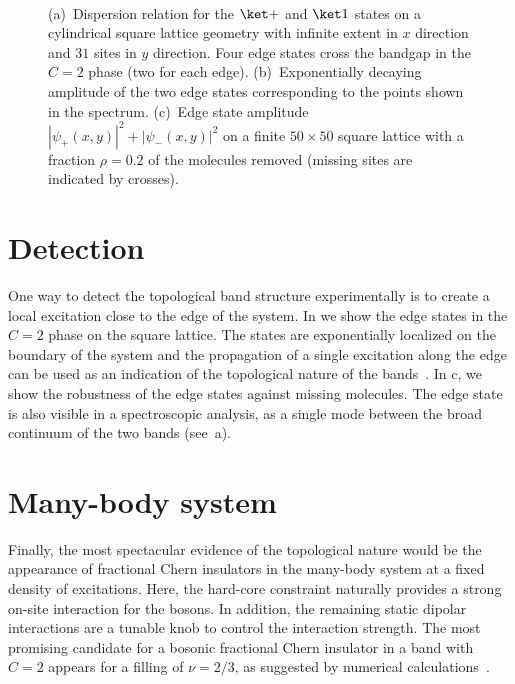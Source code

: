 \begin{figure}[ht]
    \centering
    \begin{minipage}[b]{.482\columnwidth}
         \\
        \vspace{2mm}
    \end{minipage}

    \caption{
        (a)~Dispersion relation for the $\ketp$ and $\keto$ states on a cylindrical square lattice geometry with infinite extent in $x$ direction and $31$ sites in $y$ direction.
        Four edge states cross the bandgap in the $C=2$ phase (two for each edge).
        (b)~Exponentially decaying amplitude of the two edge states corresponding to the points shown in the spectrum.
        (c)~Edge state amplitude $|\psi_+(x,y)|^2 + |\psi_-(x,y)|^2$ on a finite $50 \times 50$ square lattice with a fraction $\rho=0.2$ of the molecules removed (missing sites are indicated by crosses).
    }
\end{figure}

\section{Detection}
One way to detect the topological band structure experimentally is to create a local excitation close to the edge of the system.
In  we show the edge states in the $C=2$ phase on the square lattice.
The states are exponentially localized on the boundary of the system and the propagation of a single excitation along the edge can be used as an indication of the topological nature of the bands~\cite{Hafezi2013}.
In c, we show the robustness of the edge states against missing molecules.
The edge state is also visible in a spectroscopic analysis, as a single mode between the broad continuum of the two bands (see~a).

\section{Many-body system}
Finally, the most spectacular evidence of the topological nature would be the appearance of fractional Chern insulators in the many-body system at a fixed density of excitations.
Here, the hard-core constraint naturally provides a strong on-site interaction for the bosons.
In addition, the remaining static dipolar interactions are a tunable knob to control the interaction strength.
The most promising candidate for a bosonic fractional Chern insulator in a band with $C=2$ appears for a filling of $\nu = 2/3$, as suggested by numerical calculations~\cite{Moller2009,Wang2012a}.
